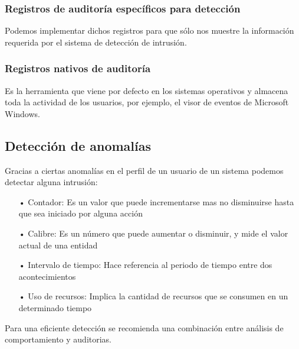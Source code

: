 \documentclass[11pt,a4paper]{article}
\begin{document}
\subsubsection{Registros de auditoría específicos para detección}
Podemos implementar dichos registros para que sólo nos muestre la información requerida por el sistema de detección de intrusión.
\subsubsection{Registros nativos de auditoría}
Es la herramienta que viene por defecto en los sistemas operativos y almacena toda la actividad de los usuarios, por ejemplo, el visor de eventos de Microsoft Windows.
\subsection{Detección de anomalías}
Gracias a ciertas anomalías en el perfil de un usuario de un sistema podemos detectar alguna intrusión:
\begin{itemize}
	\item[•] Contador: Es un valor que puede incrementarse mas no disminuirse hasta que sea iniciado por alguna acción
	\item[•] Calibre: Es un número que puede aumentar o disminuir, y mide el valor actual de una entidad
	\item[•] Intervalo de tiempo: Hace referencia al periodo de tiempo entre dos acontecimientos
	\item[•] Uso de recursos: Implica la cantidad de recursos que se consumen en un determinado tiempo
\end{itemize}
Para una eficiente detección se recomienda una combinación entre análisis de comportamiento y auditorias.
   
\end{document}
